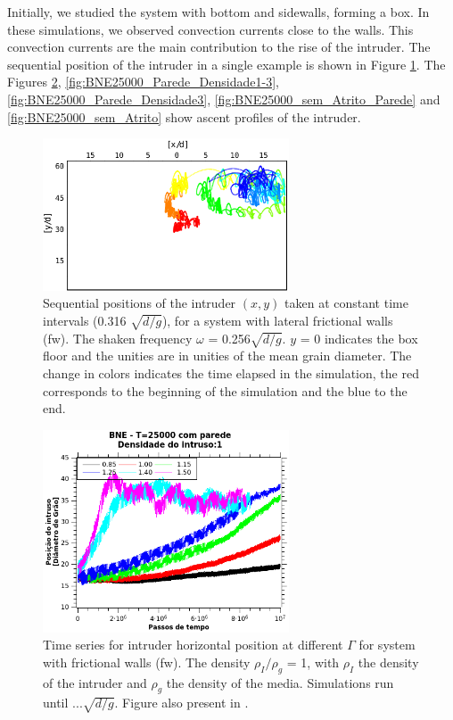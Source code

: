     Initially, we studied the system with bottom and sidewalls, forming a box. In these simulations, we observed convection currents close to the walls. This convection currents are the main contribution to the rise of the intruder. The sequential position of the intruder in a single example is shown in Figure \ref{fig:BNE_intruderwalls}. The Figures \ref{fig:BNE25000_Parede}, \ref{fig:BNE25000_Parede_Densidade1-3}, \ref{fig:BNE25000_Parede_Densidade3}, \ref{fig:BNE25000_sem_Atrito_Parede} and \ref{fig:BNE25000_sem_Atrito} show ascent profiles of the intruder.

\begin{figure}
    \centering
    \includegraphics[width=0.65\textwidth]{04-figuras/BNE_PositionWalls.pdf}
    \caption[BNE with walls: sample of intruder positions.]{Sequential positions of the intruder $(x, y)$ taken at constant time intervals (0.316 $\sqrt{d/g}$), for a system with lateral frictional walls (fw). The shaken frequency $\omega$ = 0.256$\sqrt{d/g}$. $y$ = 0 indicates the box floor and the unities are in unities of the mean grain diameter. The change in colors indicates the time elapsed in the simulation, the red corresponds to the beginning of the simulation and the blue to the end.}
    \label{fig:BNE_intruderwalls}
\end{figure}

\begin{figure}
    \centering
    \includegraphics[width=0.65\textwidth]{04-figuras/BNE25000D1.png}
    \caption[BNE with frictional walls: $\rho_I/\rho_g$ = 1.]{Time series for intruder horizontal position at different $\Gamma$ for system with frictional walls (fw). The density $\rho_I/\rho_g$ = 1, with $\rho_I$ the density of the intruder and $\rho_g$ the density of the media. Simulations run until $...\sqrt{d/g}$. Figure also present in \cite{Large-deviation_quantification_of_boundary_conditions_on_the_Brazil_nut_effect}.}
    \label{fig:BNE25000_Parede}
\end{figure}

